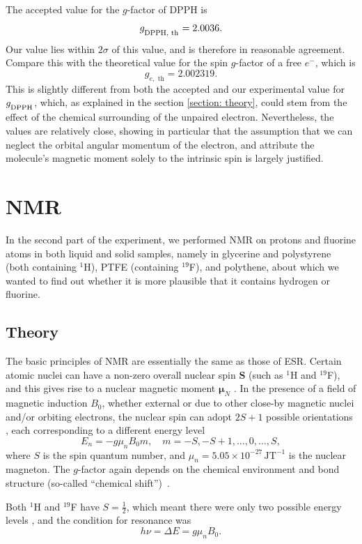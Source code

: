 \documentclass[a4paper]{jpconf}
\numberwithin{equation}{section}
\begin{document}
The accepted value for the $g$-factor of DPPH is
\[
	g_{\textsubscript{DPPH, th}} = 2.0036.
\]
Our value lies within $2\sigma$ of this value, and is therefore in reasonable agreement.
Compare this with the theoretical value for the spin $g$-factor of a free $e^-$, which is
\[
	g_{e,\text{ th}} = 2.002319.
\]
This is slightly different from both the accepted and our experimental value for $g_{\textsubscript{DPPH}}$, which, as explained in the section \ref{section: theory}, could stem from the effect of the chemical surrounding of the unpaired electron. Nevertheless, the values are relatively close, showing in particular that the assumption that we can neglect the orbital angular momentum of the electron, and attribute the molecule's magnetic moment solely to the intrinsic spin is largely justified.


\section{NMR} 
In the second part of the experiment, we performed NMR on protons and fluorine atoms in both liquid and solid samples, namely in glycerine and polystyrene (both containing ${}^1$H), PTFE (containing ${}^{19}$F), and polythene, about which we wanted to find out whether it is more plausible that it contains hydrogen or fluorine.
\subsection{Theory}

The basic principles of NMR are essentially the same as those of ESR. Certain atomic nuclei can have a non-zero overall nuclear spin $\mathbf{S}$ (such as ${}^1$H and ${}^{19}$F), and this gives rise to a nuclear magnetic moment $\bm{\mu}_N$ \cite{Smith, Gero}. In the presence of a field of magnetic induction $B_0$, whether external or due to other close-by magnetic nuclei and/or orbiting electrons, the nuclear spin can adopt $2S + 1$ possible orientations \cite{Gero, Ball}, each corresponding to a different energy level
\[
	E_n = -g \mu_n B_0 m, \quad m = -S, -S+1, \dots, 0, \dots, S, 
\] 
where $S$ is the spin quantum number, and $\mu_n = 5.05 \times 10^{-27} \, \si{\joule\tesla\tothe{-1}}$ is the nuclear magneton.
The $g$-factor again depends on the chemical environment and bond structure (so-called ``chemical shift'')~\cite{Ball}. 

Both ${}^1$H and ${}^{19}$F have $S = \tfrac{1}{2}$, which meant there were only two possible energy levels \cite{MacLaren, Gero}, and the condition for resonance was 
\begin{equation}\label{eqn: NMR resonance condition}
	h\nu = \Delta E = g \mu_n B_0.
\end{equation}
\end{document}
